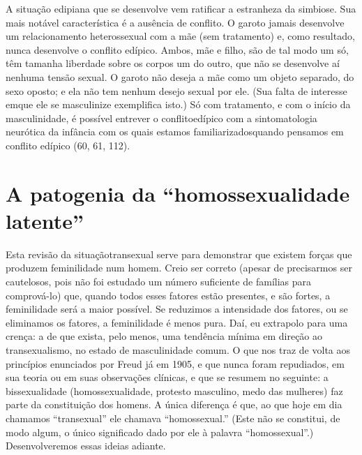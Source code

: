 A situação edipiana\idxmascucon{} que se desenvolve vem ratificar a estranheza da
simbiose. Sua mais notável característica é a ausência de conflito. O
garoto jamais desenvolve um relacionamento heterossexual com a mãe (sem
tratamento) e, como resultado, nunca desenvolve o conflito edípico.
Ambos, mãe e filho, são de tal modo um só, têm tamanha liberdade sobre
os corpos um do outro, que não se desenvolve aí nenhuma tensão sexual.
O garoto não deseja a mãe como um objeto separado, do sexo oposto; e
ela não tem nenhum desejo sexual por ele. (Sua falta de interesse em\idxtranseetio[|)]
que ele se masculinize\idxconfemasc{} exemplifica isto.) Só com tratamento, e com o
início da masculinidade, é possível entrever o conflito\idxmaesfilh[|)] edípico com a
sintomatologia neurótica da infância com os quais estamos
familiarizados\idxpaisfilh[|)] quando pensamos em conflito edípico (60, 61, 112).\idxtranse[|)]


\section{A patogenia da ``homossexualidade latente''}

Esta revisão da situação\idxhomoslate[|(] transexual serve para demonstrar que
existem forças que produzem feminilidade num homem. Creio ser correto
(apesar de precisarmos ser cautelosos, pois não foi estudado um número
suficiente de famílias para comprová-lo) que, quando todos esses
fatores estão presentes, e são fortes,\idxconfetran{} a feminilidade será a maior
possível. Se reduzimos a intensidade dos fatores, ou se eliminamos
os fatores, a feminilidade é menos pura. Daí, eu
extrapolo para uma crença: a de que exista, pelo menos, uma tendência
mínima em direção ao transexualismo, no estado de masculinidade comum.
O que nos traz de volta aos princípios enunciados por Freud\idxbisseteor{} já em 1905,
e que nunca foram repudiados,\idxfreudhomos{} em sua teoria ou em suas observações
clínicas, e que se resumem no seguinte:\idxfreudbisse{} a bissexualidade\idxbisse{}
(homossexualidade, protesto masculino,\idxmascupro{} medo das mulheres) faz parte da
constituição dos homens. A única diferença é que, ao que hoje em dia
chamamos ``transexual'' ele chamava ``homossexual.'' (Este não se constitui, de
modo algum, o único significado dado por ele à palavra ``homossexual''.)
Desenvolveremos essas ideias adiante.

